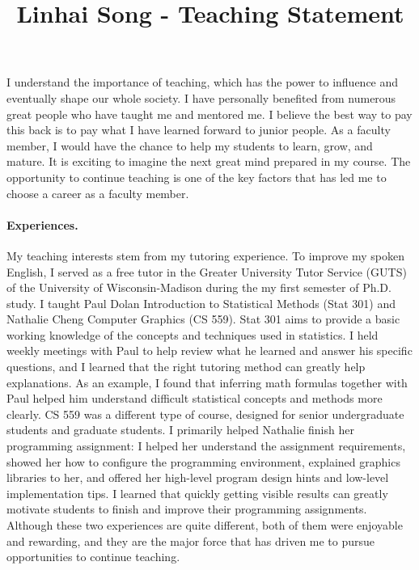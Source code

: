 \documentclass[10pt]{article}
\title{\vspace{-.7in}\bf{Linhai Song - Teaching Statement\vspace{-.4in}}}
\date{}
\begin{document}
\maketitle\vspace{-.2in}

I understand the importance of teaching, which has the power to influence and eventually shape our whole society. 
I have personally benefited from numerous great people who have taught me and mentored me. 
I believe the best way to pay this back is to pay what I have learned forward to junior people. 
As a faculty member, I would have the chance to help my students to learn, grow, and mature. 
It is exciting to imagine the next great mind prepared in my course. 
The opportunity to continue teaching is one of the key factors that has led me to choose a career as a faculty member.

\vspace{-0.1in}
\paragraph*{Experiences.} 
My teaching interests stem from my tutoring experience. 
To improve my spoken English, I served as a
free tutor in the Greater University Tutor Service (GUTS) of the University of Wisconsin-Madison during the my first semester of Ph.D. study. 
I taught Paul Dolan Introduction to Statistical Methods (Stat 301) and Nathalie Cheng
Computer Graphics (CS 559). 
Stat 301 aims to provide a basic working knowledge of the concepts and techniques
used in statistics. 
I held weekly meetings with Paul to help review what he learned and answer his specific questions, and I learned that the right tutoring method can greatly help explanations. 
As an example, I found that inferring math formulas together with Paul helped him understand difficult statistical concepts and methods more clearly. 
CS 559 was a different type of course, designed for senior undergraduate students and graduate students. 
I primarily helped Nathalie finish her programming assignment: I helped her understand the assignment requirements, 
showed her how to configure the programming environment, 
explained graphics libraries to her, 
and offered her high-level program design hints and low-level implementation tips. 
I learned that quickly getting visible results can greatly motivate students to finish and improve their programming assignments. 
Although these two experiences are quite
different, both of them were enjoyable and rewarding, and they are the major force that has driven me to pursue opportunities to continue teaching.
\end{document}
